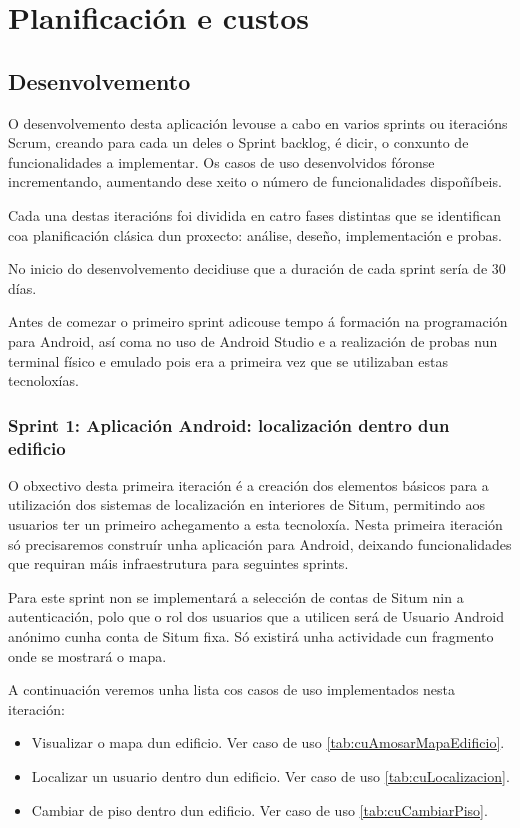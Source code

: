 \chapter{Planificación e custos}

\section{Desenvolvemento}
O desenvolvemento desta aplicación levouse a cabo en varios sprints ou iteracións Scrum, creando para cada un deles o Sprint backlog, é dicir, o conxunto de funcionalidades a implementar. Os casos de uso desenvolvidos fóronse incrementando, aumentando dese xeito o número de funcionalidades dispoñíbeis.

Cada una destas iteracións foi dividida en catro fases distintas que se identifican coa planificación clásica dun proxecto: análise, deseño, implementación e probas.

No inicio do desenvolvemento decidiuse que a duración de cada sprint sería de 30 días.

Antes de comezar o primeiro sprint adicouse tempo á formación na programación para Android, así coma no uso de Android Studio e a realización de probas nun terminal físico e emulado pois era a primeira vez que se utilizaban estas tecnoloxías.

\subsection{Sprint 1: Aplicación Android: localización dentro dun edificio}
O obxectivo desta primeira iteración é a creación dos elementos básicos para a utilización dos sistemas de localización en interiores de Situm, permitindo aos usuarios ter un primeiro achegamento a esta tecnoloxía. Nesta primeira iteración só precisaremos construír unha aplicación para Android, deixando funcionalidades que requiran máis infraestrutura para seguintes sprints.

Para este sprint non se implementará a selección de contas de Situm nin a autenticación, polo que o rol dos usuarios que a utilicen será de Usuario Android anónimo cunha conta de Situm fixa. Só existirá unha actividade cun fragmento onde se mostrará o mapa.

A continuación veremos unha lista cos casos de uso implementados nesta iteración:

\begin{itemize}
	\item Visualizar o mapa dun edificio. Ver caso de uso \ref{tab:cuAmosarMapaEdificio}.
	\item Localizar un usuario dentro dun edificio. Ver caso de uso \ref{tab:cuLocalizacion}.
	\item Cambiar de piso dentro dun edificio. Ver caso de uso \ref{tab:cuCambiarPiso}.
\end{itemize}

